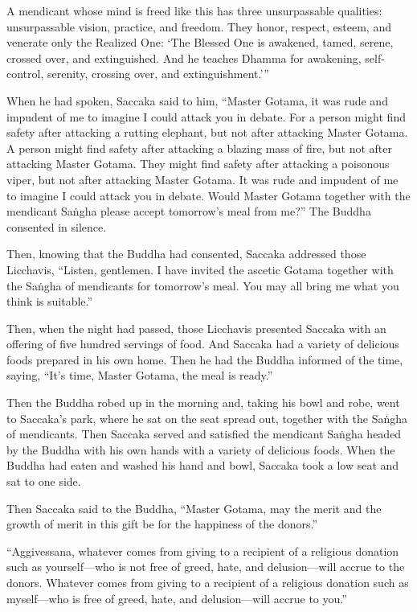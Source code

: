 \documentclass[12pt,openany]{book}%
\begin{document}
A mendicant whose mind is freed like this has three unsurpassable qualities: unsurpassable vision, practice, and freedom. They honor, respect, esteem, and venerate only the Realized One: ‘The Blessed One is awakened, tamed, serene, crossed over, and extinguished. And he teaches Dhamma for awakening, self-control, serenity, crossing over, and extinguishment.’” 

When he had spoken, Saccaka said to him, “Master Gotama, it was rude and impudent of me to imagine I could attack you in debate. For a person might find safety after attacking a rutting elephant, but not after attacking Master Gotama. A person might find safety after attacking a blazing mass of fire, but not after attacking Master Gotama. They might find safety after attacking a poisonous viper, but not after attacking Master Gotama. It was rude and impudent of me to imagine I could attack you in debate. Would Master Gotama together with the mendicant \textsanskrit{Saṅgha} please accept tomorrow’s meal from me?” The Buddha consented in silence. 

Then, knowing that the Buddha had consented, Saccaka addressed those Licchavis, “Listen, gentlemen. I have invited the ascetic Gotama together with the \textsanskrit{Saṅgha} of mendicants for tomorrow’s meal. You may all bring me what you think is suitable.” 

Then, when the night had passed, those Licchavis presented Saccaka with an offering of five hundred servings of food. And Saccaka had a variety of delicious foods prepared in his own home. Then he had the Buddha informed of the time, saying, “It’s time, Master Gotama, the meal is ready.” 

Then the Buddha robed up in the morning and, taking his bowl and robe, went to Saccaka’s park, where he sat on the seat spread out, together with the \textsanskrit{Saṅgha} of mendicants. Then Saccaka served and satisfied the mendicant \textsanskrit{Saṅgha} headed by the Buddha with his own hands with a variety of delicious foods. When the Buddha had eaten and washed his hand and bowl, Saccaka took a low seat and sat to one side. 

Then Saccaka said to the Buddha, “Master Gotama, may the merit and the growth of merit in this gift be for the happiness of the donors.” 

“Aggivessana, whatever comes from giving to a recipient of a religious donation such as yourself—who is not free of greed, hate, and delusion—will accrue to the donors. Whatever comes from giving to a recipient of a religious donation such as myself—who is free of greed, hate, and delusion—will accrue to you.” 
\end{document}
